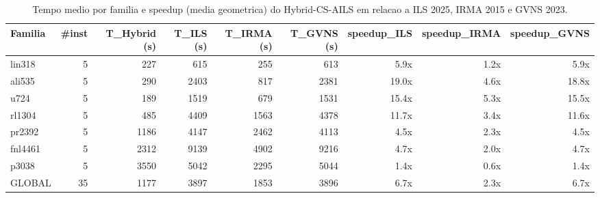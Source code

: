 \begin{table}[!htb]
\centering
\caption{Tempo medio por familia e speedup (media geometrica) do Hybrid-CS-AILS em relacao a ILS 2025, IRMA 2015 e GVNS 2023.}
\label{tab:speedup}
\small
\begin{tabular}{lrrrrrrrr}
\hline
Familia & #inst & T\_Hybrid (s) & T\_ILS (s) & T\_IRMA (s) & T\_GVNS (s) & speedup\_ILS & speedup\_IRMA & speedup\_GVNS \\
\hline
lin318 & 5 & 227 & 615 & 255 & 613 & 5.9x & 1.2x & 5.9x \\
ali535 & 5 & 290 & 2403 & 817 & 2381 & 19.0x & 4.6x & 18.8x \\
u724 & 5 & 189 & 1519 & 679 & 1531 & 15.4x & 5.3x & 15.5x \\
rl1304 & 5 & 485 & 4409 & 1563 & 4378 & 11.7x & 3.4x & 11.6x \\
pr2392 & 5 & 1186 & 4147 & 2462 & 4113 & 4.5x & 2.3x & 4.5x \\
fnl4461 & 5 & 2312 & 9139 & 4902 & 9216 & 4.7x & 2.0x & 4.7x \\
p3038 & 5 & 3550 & 5042 & 2295 & 5044 & 1.4x & 0.6x & 1.4x \\
GLOBAL & 35 & 1177 & 3897 & 1853 & 3896 & 6.7x & 2.3x & 6.7x \\
\hline
\end{tabular}
\end{table}
